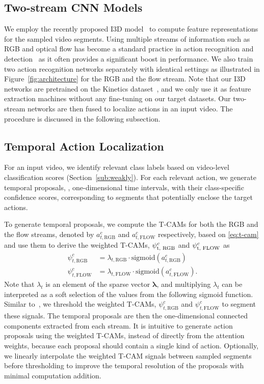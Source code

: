 \documentclass[10pt,twocolumn,letterpaper]{article}
\begin{document}
\subsection{Two-stream CNN Models} 
\label{sub:two-stream}
We employ the recently proposed I3D model~\cite{carreira17quo} to compute feature representations for the sampled video segments.
Using multiple streams of information such as RGB and optical flow has become a standard practice in action recognition and detection~\cite{carreira17quo,feichtenhofer16convolutional,simonyan14two} as it often provides a significant boost in performance.
We also train two action recognition networks separately with identical settings as illustrated in Figure~\ref{fig:architecture} for the RGB and the flow stream.
Note that our I3D networks are pretrained on the Kinetics dataset~\cite{kay2017kinetics}, and we only use it as feature extraction machines without any fine-tuning on our target datasets.
Our two-stream networks are then fused to localize actions in an input video.
The procedure is discussed in the following subsection.

\subsection{Temporal Action Localization}
\label{sub:temporal}
For an input video, we identify relevant class labels based on video-level classification scores (Section~\ref{sub:weakly}).
For each relevant action, we generate temporal proposals, \ie, one-dimensional time intervals, with their class-specific confidence scores, corresponding to segments that potentially enclose the target actions.


To generate temporal proposals, we compute the T-CAMs for both the RGB and the flow streams, denoted by $a_{t,\text{RGB}}^c$ and $a_{t,\text{FLOW}}^c$ respectively, based on \eqref{eq:t-cam} and use them to derive the weighted T-CAMs, $\psi^c_\text{t, \text{RGB}}$ and $\psi^c_\text{t, \text{FLOW}}$ as
\begin{align}
\psi^c_{t,\text{RGB}} & = \lambda_{t, \text{RGB}} \cdot \text{sigmoid}(a_{t, \text{RGB}}^c) \\
\psi^c_{t, \text{FLOW}} & = \lambda_{t, \text{FLOW}} \cdot \text{sigmoid}(a_{t, \text{FLOW}}^c).
\end{align}
Note that $\lambda_t$ is an element of the sparse vector $\bm \lambda$, and multiplying $\lambda_t$ can be interpreted as a soft selection of the values from the following sigmoid function.
Similar to~\cite{zhou16learning}, we threshold the weighted T-CAMs, $\psi^c_{t,\text{RGB}}$ and $\psi^c_{t,\text{FLOW}}$ to segment these signals. The temporal proposals are then the one-dimensional connected components extracted from each stream.
It is intuitive to generate action proposals using the weighted T-CAMs, instead of directly from the attention weights, because each proposal should contain a single kind of action.
Optionally, we linearly interpolate the weighted T-CAM signals between sampled segments before thresholding to improve the temporal resolution of the proposals with minimal computation addition.
\end{document}
